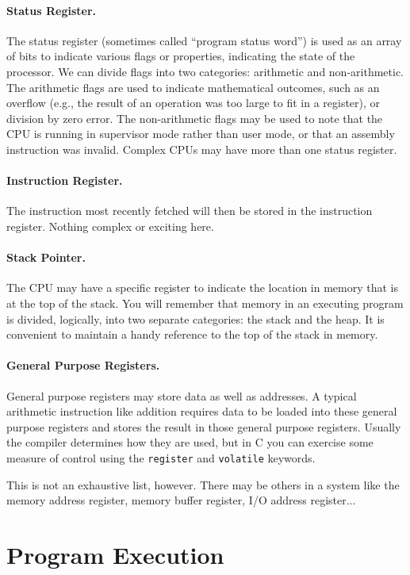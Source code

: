 \paragraph{Status Register.} The status register (sometimes called ``program status word'') is used as an array of bits to indicate various flags or properties, indicating the state of the processor. We can divide flags into two categories: arithmetic and non-arithmetic. The arithmetic flags are used to indicate mathematical outcomes, such as an overflow (e.g., the result of an operation was too large to fit in a register), or division by zero error. The non-arithmetic flags may be used to note that the CPU is running in supervisor mode rather than user mode, or that an assembly instruction was invalid. Complex CPUs may have more than one status register. 

\paragraph{Instruction Register.} The instruction most recently fetched will then be stored in the instruction register. Nothing complex or exciting here.

\paragraph{Stack Pointer.} The CPU may have a specific register to indicate the location in memory that is at the top of the stack. You will remember that memory in an executing program is divided, logically, into two separate categories: the stack and the heap. It is convenient to maintain a handy reference to the top of the stack in memory.

\paragraph{General Purpose Registers.} General purpose registers may store data as well as addresses. A typical arithmetic instruction like addition requires data to be loaded into these general purpose registers and stores the result in those general purpose registers. Usually the compiler determines how they are used, but in C you can exercise some measure of control using the \texttt{register} and \texttt{volatile} keywords.

This is not an exhaustive list, however. There may be others in a system like the memory address register, memory buffer register, I/O address register...


\section*{Program Execution}

